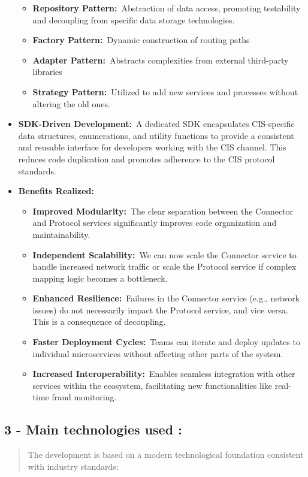 \documentclass[12pt,a4paper]{report}
\begin{document}
\begin{itemize}
  \begin{itemize}
  \item
    \textbf{Repository Pattern:}~Abstraction of data access, promoting
    testability and decoupling from specific data storage technologies.
  \item
    \textbf{Factory Pattern:}~Dynamic construction of routing paths
  \item
    \textbf{Adapter Pattern:}~Abstracts complexities from external
    third-party libraries
  \item
    \textbf{Strategy Pattern:}~Utilized to add new services and
    processes without altering the old ones.
  \end{itemize}
\item
  \textbf{SDK-Driven Development:}~A dedicated SDK encapsulates
  CIS-specific data structures, enumerations, and utility functions to
  provide a consistent and reusable interface for developers working
  with the CIS channel. This reduces code duplication and promotes
  adherence to the CIS protocol standards.
\item
  \textbf{Benefits Realized:}

  \begin{itemize}
  \item
    \textbf{Improved Modularity:}~The clear separation between the
    Connector and Protocol services significantly improves code
    organization and maintainability.
  \item
    \textbf{Independent Scalability:}~We can now scale the Connector
    service to handle increased network traffic or scale the Protocol
    service if complex mapping logic becomes a bottleneck.
  \item
    \textbf{Enhanced Resilience:}~Failures in the Connector service
    (e.g., network issues) do not necessarily impact the Protocol
    service, and vice versa. This is a consequence of decoupling.
  \item
    \textbf{Faster Deployment Cycles:}~Teams can iterate and deploy
    updates to individual microservices without affecting other parts of
    the system.
  \item
    \textbf{Increased Interoperability:}~Enables seamless integration
    with other services within the ecosystem, facilitating new
    functionalities like real-time fraud monitoring.
  \end{itemize}
\end{itemize}

\subsection{3 - Main technologies
used :}
\begin{quote}
The development is based on a modern technological foundation consistent
with industry standards:
\end{quote}
\end{document}
